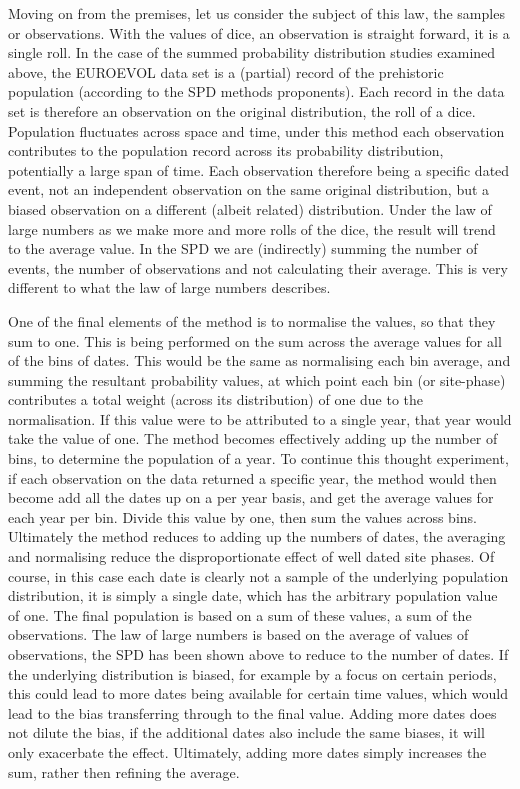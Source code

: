 Moving on from the premises, let us consider the subject of this law, the samples or observations. With the values of dice, an observation is straight forward, it is a single roll. In the case of the summed probability distribution studies examined above, the EUROEVOL data set is a (partial) record of the prehistoric population (according to the SPD methods proponents). Each record in the data set is therefore an observation on the original distribution, the roll of a dice. Population fluctuates across space and time, under this method each observation contributes to the population record across its probability distribution, potentially a large span of time. Each observation therefore being a specific dated event, not an independent observation on the same original distribution, but a biased observation on a different (albeit related) distribution. Under the law of large numbers as we make more and more rolls of the dice, the result will trend to the average value. In the SPD we are (indirectly) summing the number of events, the number of observations and not calculating their average. This is very different to what the law of large numbers describes. 

One of the final elements of the method is to normalise the values, so that they sum to one. This is being performed on the sum across the average values for all of the bins of dates. This would be the same as normalising each bin average, and summing the resultant probability values, at which point each bin (or site-phase) contributes a total weight (across its distribution) of one due to the normalisation. If this value were to be attributed to a single year, that year would take the value of one. The method becomes effectively adding up the number of bins, to determine the population of a year. To continue this thought experiment, if each observation on the data returned a specific year, the method would then become add all the dates up on a per year basis, and get the average values for each year per bin. Divide this value by one, then sum the values across bins. Ultimately the method reduces to adding up the numbers of dates, the averaging and normalising reduce the disproportionate effect of well dated site phases. Of course, in this case each date is clearly not a sample of the underlying population distribution, it is simply a single date, which has the arbitrary population value of one. The final population is based on a sum of these values, a sum of the observations. The law of large numbers is based on the average of values of observations, the SPD has been shown above to reduce to the number of dates. If the underlying distribution is biased, for example by a focus on certain periods, this could lead to more dates being available for certain time values, which would lead to the bias transferring through to the final value. Adding more dates does not dilute the bias, if the additional dates also include the same biases, it will only exacerbate the effect. Ultimately, adding more dates simply increases the sum, rather then refining the average.


